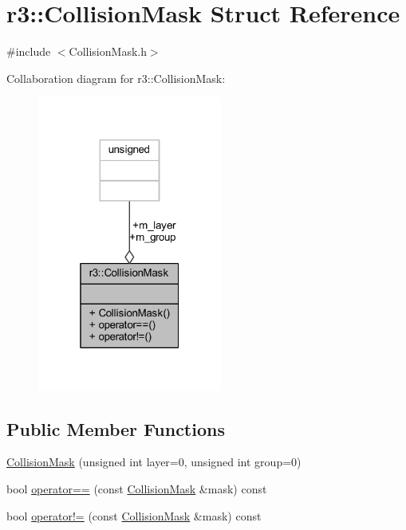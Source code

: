 \hypertarget{structr3_1_1_collision_mask}{}\section{r3\+:\+:Collision\+Mask Struct Reference}
\label{structr3_1_1_collision_mask}


{\ttfamily \#include $<$Collision\+Mask.\+h$>$}



Collaboration diagram for r3\+:\+:Collision\+Mask\+:\nopagebreak
\begin{figure}[H]
\begin{center}
\leavevmode
\includegraphics[width=172pt]{structr3_1_1_collision_mask__coll__graph}
\end{center}
\end{figure}
\subsection*{Public Member Functions}
\begin{DoxyCompactItemize}
\item 
\mbox{\hyperlink{structr3_1_1_collision_mask_a7f1fb1fae3d7e14677ad2590fcd661e0}{Collision\+Mask}} (unsigned int layer=0, unsigned int group=0)
\item 
bool \mbox{\hyperlink{structr3_1_1_collision_mask_a7d1315f7324fc03cee09df2c364f5c54}{operator==}} (const \mbox{\hyperlink{structr3_1_1_collision_mask}{Collision\+Mask}} \&mask) const
\item 
bool \mbox{\hyperlink{structr3_1_1_collision_mask_ae6bbe0e4390b584497c854d39ec12c6a}{operator!=}} (const \mbox{\hyperlink{structr3_1_1_collision_mask}{Collision\+Mask}} \&mask) const
\end{DoxyCompactItemize}
